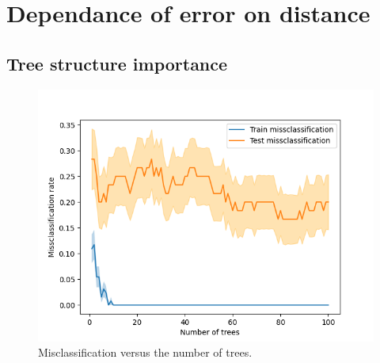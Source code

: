 \documentclass[9pt]{IEEEtran}
\begin{document}
\section{Dependance of error on distance}

\subsection{Tree structure importance}

\begin{figure}[h]
    \centering
    \includegraphics[width=0.95\columnwidth]{figures/missclass_num_trees.png}
    \caption{Misclassification versus the number of trees.}
    \label{fig:missclass_num_trees}
\end{figure}
\end{document}
